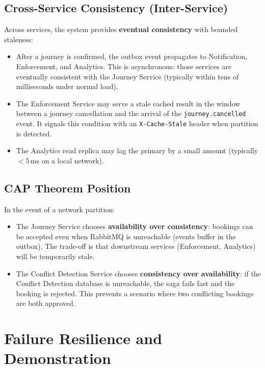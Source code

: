\documentclass[12pt,a4paper]{article}
\begin{document}
\subsection{Cross-Service Consistency (Inter-Service)}

Across services, the system provides \textbf{eventual consistency} with bounded staleness:

\begin{itemize}[leftmargin=*]
  \item After a journey is confirmed, the outbox event propagates to Notification, Enforcement, and Analytics. This is asynchronous: those services are eventually consistent with the Journey Service (typically within tens of milliseconds under normal load).
  \item The Enforcement Service may serve a stale cached result in the window between a journey cancellation and the arrival of the \texttt{journey.cancelled} event. It signals this condition with an \texttt{X-Cache-Stale} header when partition is detected.
  \item The Analytics read replica may lag the primary by a small amount (typically $<$5\,ms on a local network).
\end{itemize}

\subsection{CAP Theorem Position}

In the event of a network partition:

\begin{itemize}[leftmargin=*]
  \item The Journey Service chooses \textbf{availability over consistency}: bookings can be accepted even when RabbitMQ is unreachable (events buffer in the outbox). The trade-off is that downstream services (Enforcement, Analytics) will be temporarily stale.
  \item The Conflict Detection Service chooses \textbf{consistency over availability}: if the Conflict Detection database is unreachable, the saga fails fast and the booking is rejected. This prevents a scenario where two conflicting bookings are both approved.
\end{itemize}

\section{Failure Resilience and Demonstration}
\end{document}
